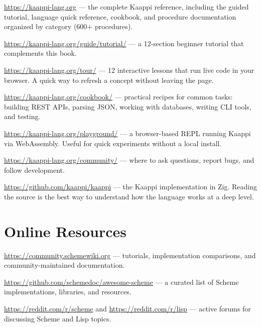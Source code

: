 \begin{description}[leftmargin=1em, labelindent=0em]

\item[Documentation Site] \url{https://kaappi-lang.org} --- the complete Kaappi reference, including the guided tutorial, language quick reference, cookbook, and procedure documentation organized by category (600+ procedures).

\item[Tutorial] \url{https://kaappi-lang.org/guide/tutorial/} --- a 12-section beginner tutorial that complements this book.

\item[Tour] \url{https://kaappi-lang.org/tour/} --- 12 interactive lessons that run live code in your browser. A quick way to refresh a concept without leaving the page.

\item[Cookbook] \url{https://kaappi-lang.org/cookbook/} --- practical recipes for common tasks: building REST APIs, parsing JSON, working with databases, writing CLI tools, and testing.

\item[Playground] \url{https://kaappi-lang.org/playground/} --- a browser-based REPL running Kaappi via WebAssembly. Useful for quick experiments without a local install.

\item[Community] \url{https://kaappi-lang.org/community/} --- where to ask questions, report bugs, and follow development.

\item[Source Code] \url{https://github.com/kaappi/kaappi} --- the Kaappi implementation in Zig. Reading the source is the best way to understand how the language works at a deep level.

\end{description}

\section{Online Resources}

\begin{description}[leftmargin=1em, labelindent=0em]

\item[Scheme Community Wiki] \url{https://community.schemewiki.org} --- tutorials, implementation comparisons, and community-maintained documentation.

\item[Awesome Scheme] \url{https://github.com/schemedoc/awesome-scheme} --- a curated list of Scheme implementations, libraries, and resources.

\item[Scheme and Lisp Communities] \url{https://reddit.com/r/scheme} and \url{https://reddit.com/r/lisp} --- active forums for discussing Scheme and Lisp topics.

\end{description}
